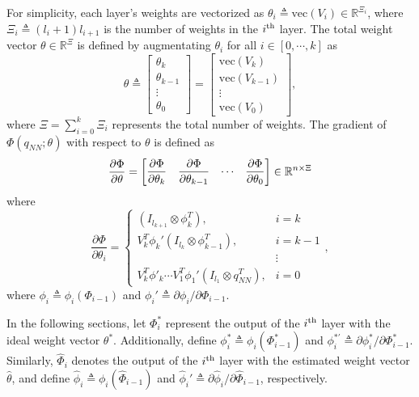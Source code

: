 \documentclass[lettersize,journal]{IEEEtran}
\begin{document}
For simplicity, each layer's weights are vectorized as $\theta_i\triangleq\text{vec}(V_i)\in\mathbb{R}^{\Xi_i}$, where $\Xi_i\triangleq (l_i+1)l_{i+1}$ is the number of weights in the $i\textsuperscript{th}$ layer. The total weight vector $\theta\in\mathbb{R}^{\Xi}$ is defined by augmentating $\theta_i$ for all $i\in \left[0,\cdots,k\right]$ as 
\begin{equation*}
    \theta \triangleq 
    \begin{bmatrix}
        \theta_k\\
        \theta_{k-1}\\
        \vdots\\
        \theta_0
    \end{bmatrix}
    =
    \begin{bmatrix}
        \text{vec}(V_k)\\
        \text{vec}(V_{k-1})\\
        \vdots\\
        \text{vec}(V_0)
    \end{bmatrix},
\end{equation*}
where $\Xi={\sum_{i=0}^{k} \Xi_i}$ represents the total number of weights. The gradient of $ \Phi(q_{NN};\theta)$ with respect to $\theta$ is defined as
\begin{equation}
    {\partial\Phi\over\partial \theta}=
    \begin{bmatrix}
        \dfrac{\partial \Phi}{\partial \theta_k}&
        \dfrac{\partial \Phi}{\partial \theta_{k-1}}&
    \cdots &
        \dfrac{\partial \Phi}{\partial \theta_0}
    \end{bmatrix}
    \in\mathbb{R}^{n \times \Xi}
    \label{eq. nabla phi}
\end{equation}
where
\begin{equation*}
    \frac{\partial \Phi}{\partial \theta_i} = 
    \begin{cases}
        (I_{l_{k+1}}\otimes \phi_{k}^T  ), & i=k \\
        V_k^T   \phi_{k}' (I_{l_{k}}\otimes  \phi_{k-1}^T  ), & i=k-1\\
        &\vdots \\
        V_k^T   \phi'_{k} \cdots V_1^T  \phi_1' (I_{l_1}\otimes q_{NN}^T  ), & i = 0
    \end{cases},
\end{equation*}
where $\phi_i\triangleq \phi_i(\Phi_{i-1})$ and $\phi_i'\triangleq \partial \phi_i/\partial \Phi_{i-1}$.

In the following sections, let $\Phi^*_i$ represent the output of the $i\textsuperscript{th}$ layer with the ideal weight vector $\theta^*$. Additionally, define $\phi^*_i\triangleq\phi_i(\Phi^*_{i-1})$ and $\phi^{*'}_i\triangleq \partial \phi^*_i/\partial \Phi^*_{i-1}$. Similarly, $\hat\Phi_i$ denotes the output of the $i\textsuperscript{th}$ layer with the estimated weight vector $\hat \theta$, and define $\hat\phi_i\triangleq\phi_i(\hat\Phi_{i-1})$ and $\hat\phi_i'\triangleq \partial \hat\phi_i/\partial \hat\Phi_{i-1}$, respectively.
\end{document}
